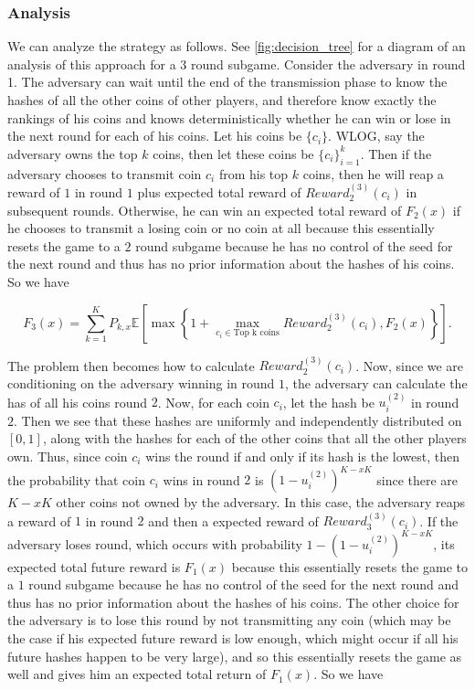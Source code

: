 \documentclass[11pt, oneside]{article}   	%
\begin{document}
\subsubsection{Analysis}
We can analyze the strategy as follows. See \ref{fig:decision_tree} for a diagram of an analysis of this approach for a 3 round subgame. Consider the adversary in round 1. The adversary can wait until the end of the transmission phase to know the hashes of all the other coins of other players, and therefore know exactly the rankings of his coins and knows deterministically whether he can win or lose in the next round for each of his coins. Let his coins be $\{c_i\}$. WLOG, say the adversary owns the top $k$ coins, then let these coins be $\{c_i\}_{i=1}^k$. Then if the adversary chooses to transmit coin $c_i$ from his top $k$ coins, then he will reap a reward of $1$ in round $1$ plus expected total reward of $Reward^{(3)}_2(c_i)$ in subsequent rounds. Otherwise, he can win an expected total reward of $F_2(x)$ if he chooses to transmit a losing coin or no coin at all because this essentially resets the game to a $2$ round subgame because he has no control of the seed for the next round and thus has no prior information about the hashes of his coins. So we have

$$
F_3(x) = \sum_{k=1}^{K} P_{k, x} \mathbb{E}\left[ \max\left\{1+\max_{c_i \in \text{Top k coins}} Reward^{(3)}_2(c_i), F_2(x) \right\}\right].
$$

The problem then becomes how to calculate $Reward^{(3)}_2(c_i)$. Now, since we are conditioning on the adversary winning in round $1$, the adversary can calculate the has of all his coins round $2$. Now, for each coin $c_i$, let the hash be $u_i^{(2)}$ in round $2$. Then we see that these hashes are uniformly and independently distributed on $[0,1]$, along with the hashes for each of the other coins that all the other players own. Thus, since coin $c_i$ wins the round if and only if its hash is the lowest, then the probability that coin $c_i$ wins in round $2$ is $(1-u^{(2)}_i)^{K-xK}$ since there are $K-xK$ other coins not owned by the adversary. In this case, the adversary reaps a reward of $1$ in round $2$ and then a expected reward of $Reward^{(3)}_3(c_i)$. If the adversary loses round, which occurs with probability $1-(1-u^{(2)}_i)^{K-xK}$, its expected total future reward is $F_1(x)$ because this essentially resets the game to a $1$ round subgame because he has no control of the seed for the next round and thus has no prior information about the hashes of his coins. The other choice for the adversary is to lose this round by not transmitting any coin (which may be the case if his expected future reward is low enough, which might occur if all his future hashes happen to be very large), and so this essentially resets the game as well and gives him an expected total return of $F_1(x)$. So we have
\end{document}
